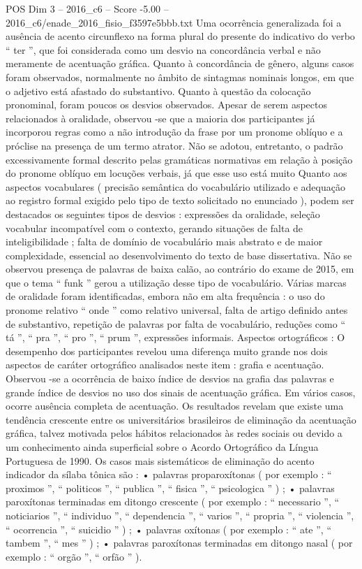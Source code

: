 \begin{textsample}{POS Dim 3 – 2016\_c6 – Score -5.00 – 2016\_c6/enade\_2016\_fisio\_f3597e5bbb.txt}
Uma ocorrência generalizada foi a ausência de acento circunflexo na forma plural do presente do indicativo do verbo “ ter ”, que foi considerada como um desvio na concordância verbal e não meramente de acentuação gráfica.
Quanto à concordância de gênero, alguns casos foram observados, normalmente no âmbito de sintagmas nominais longos, em que o adjetivo está afastado do substantivo.
Quanto à questão da colocação pronominal, foram poucos os desvios observados.
Apesar de serem aspectos relacionados à oralidade, observou -se que a maioria dos participantes já incorporou regras como a não introdução da frase por um pronome oblíquo e a próclise na presença de um termo atrator.
Não se adotou, entretanto, o padrão excessivamente formal descrito pelas gramáticas normativas em relação à posição do pronome oblíquo em locuções verbais, já que esse uso está muito Quanto aos aspectos vocabulares ( precisão semântica do vocabulário utilizado e adequação ao registro formal exigido pelo tipo de texto solicitado no enunciado ), podem ser destacados os seguintes tipos de desvios : expressões da oralidade, seleção vocabular incompatível com o contexto, gerando situações de falta de inteligibilidade ; falta de domínio de vocabulário mais abstrato e de maior complexidade, essencial ao desenvolvimento do texto de base dissertativa.
Não se observou presença de palavras de baixa calão, ao contrário do exame de 2015, em que o tema “ funk ” gerou a utilização desse tipo de vocabulário.
Várias marcas de oralidade foram identificadas, embora não em alta frequência : o uso do pronome relativo “ onde ” como relativo universal, falta de artigo definido antes de substantivo, repetição de palavras por falta de vocabulário, reduções como “ tá ”, “ pra ”, “ pro ”, “ prum ”, expressões informais.
Aspectos ortográficos : O desempenho dos participantes revelou uma diferença muito grande nos dois aspectos de caráter ortográfico analisados neste item : grafia e acentuação.
Observou -se a ocorrência de baixo índice de desvios na grafia das palavras e grande índice de desvios no uso dos sinais de acentuação gráfica.
Em vários casos, ocorre ausência completa de acentuação.
Os resultados revelam que existe uma tendência crescente entre os universitários brasileiros de eliminação da acentuação gráfica, talvez motivada pelos hábitos relacionados às redes sociais ou devido a um conhecimento ainda superficial sobre o Acordo Ortográfico da Língua Portuguesa de 1990.
Os casos mais sistemáticos de eliminação do acento indicador da sílaba tônica são : • palavras proparoxítonas ( por exemplo : “ proximos ”, “ politicos ”, “ publica ”, “ fisica ”, “ psicologica ” ) ; • palavras paroxítonas terminadas em ditongo crescente ( por exemplo : “ necessario ”, “ noticiarios ”, “ individuo ”, “ dependencia ”, “ varios ”, “ propria ”, “ violencia ”, “ ocorrencia ”, “ suicidio ” ) ; • palavras oxítonas ( por exemplo : “ ate ”, “ tambem ”, “ mes ” ) ; • palavras paroxítonas terminadas em ditongo nasal ( por exemplo : “ orgão ”, “ orfão ” ).

\end{textsample}
